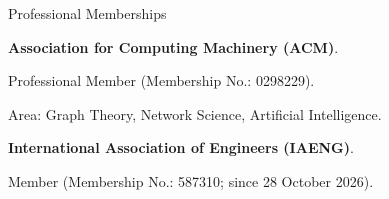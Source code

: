 \begin{rubric}{Professional Memberships}

\entry*[2026 -- Present]%
\textbf{Association for Computing Machinery (ACM)}.\par
Professional Member (Membership No.: 0298229).\par Area: Graph Theory, Network Science, Artificial Intelligence.

\entry*[2026 -- Present]%
\textbf{International Association of Engineers (IAENG)}.\par
Member (Membership No.: 587310; since 28 October 2026).

\end{rubric}
